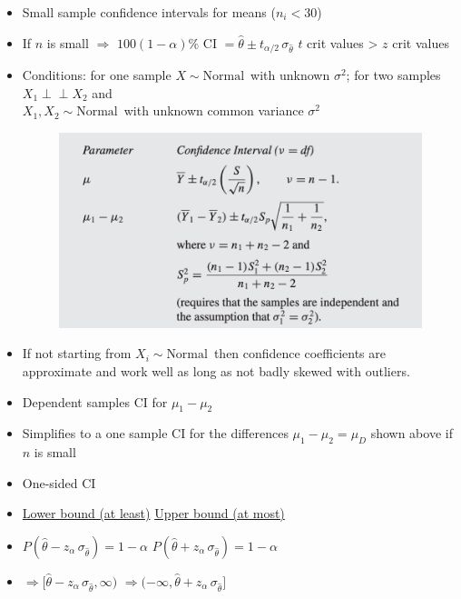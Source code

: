 \documentclass{article}
\newcommand{\follow}[1]{\sim \text{#1}\,}		%
\newcommand{\ind}{\perp \!\!\! \perp}			%
\begin{document}
\begin{itemize}
    \item Small sample confidence intervals for means ($n_i < 30$)
    \item[] If $n$ is small $\Longrightarrow$ $100 (1 - \alpha)\% \text{ CI } = \hat{\theta} \pm t_{\alpha / 2} \, \sigma_{\hat{\theta}}$ \hspace{100pt} $t$ crit values > $z$ crit values
    \item[] Conditions: for one sample $X \follow{Normal}$ with unknown $\sigma^2$; for two samples $X_1 \ind X_2$ and \\ $X_1, X_2 \follow{Normal}$ with unknown common variance $\sigma^2$
    \begin{figure}[H]
        \center\includegraphics[scale=0.5]{images/small-n-ci.png}
    \end{figure}
    \item[] If not starting from $X_i \follow{Normal}$ then confidence coefficients are approximate and work well as long as not badly skewed with outliers.
    \item Dependent samples CI for $\mu_1 - \mu_2$
    \item[] Simplifies to a one sample CI for the differences $\mu_1 - \mu_ 2 = \mu_D$ shown above if $n$ is small\bigskip
    \item One-sided CI
    \item[] \ul{Lower bound (at least)} \hspace{200pt} \ul{Upper bound (at most)}
    \item[] $P(\hat{\theta} - z_\alpha \, \sigma_{\hat{\theta}}) = 1 - \alpha$  \hspace{150pt} $P(\hat{\theta} + z_\alpha \, \sigma_{\hat{\theta}}) = 1 - \alpha$
    \item[] $\Longrightarrow [\hat{\theta} - z_\alpha \, \sigma_{\hat{\theta}}, \infty)$ \hspace{170pt} $\Longrightarrow (-\infty, \hat{\theta} + z_\alpha \, \sigma_{\hat{\theta}}]$
\end{itemize}\bigskip
\end{document}
